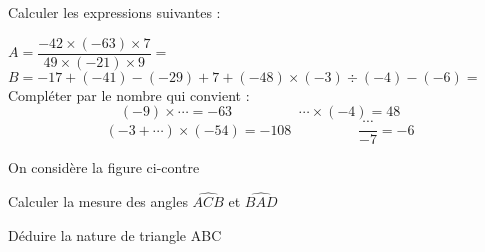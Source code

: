 \documentclass[a4paper,addpoints,12pt]{exam}
\begin{document}
\devoir[ds=true,num=3 ,niv=1 , date=10/01/2023,prv=false ]
\begin{exo}[12]
\begin{questions}
\question[4] Calculer les expressions suivantes :

$A= \dfrac{-42\times (-63)\times 7}{49\times (-21)\times 9}=$\anserline[2]
$B=-17+(-41)-(-29)+7+(-48)\times (-3)\div (-4)-(-6)=$\anserline[3]\vspace{-1cm}
\question[8] Compléter par le nombre qui convient :
\[(-9)\times \cdots = -63 \hspace{2cm} \cdots \times (-4) = 48\]
\[ (-3+ \cdots )\times (-54)= -108 \hspace{2cm} \dfrac{\cdots}{-7}=-6\] 
\end{questions}
\end{exo}

\begin{exo}[8]
\begin{minipage}{.65\linewidth}
On considère la figure ci-contre 
\begin{questions}
\question[4] Calculer la mesure des angles $\widehat{ACB}$ et $\widehat{BAD}$ \newline\anserline[3]
\end{questions}
\end{minipage}
\begin{minipage}{.35\linewidth}
\end{minipage}
\begin{questions}
\setcounter{question}{1}
\question[4] Déduire la nature de triangle ABC
\anserline[4] 
\end{questions}
\end{exo}
\end{document}
